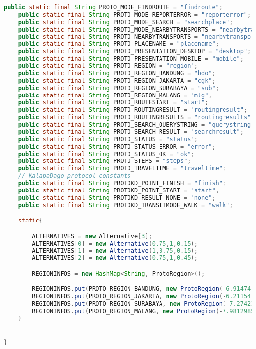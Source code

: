 \begin{lstlisting}[language=Java,basicstyle=\tiny,caption=Constants.java]
    public static final String PROTO_MODE_FINDROUTE = "findroute";
    public static final String PROTO_MODE_REPORTERROR = "reporterror";
    public static final String PROTO_MODE_SEARCH = "searchplace";
    public static final String PROTO_MODE_NEARBYTRANSPORTS = "nearbytransports";
    public static final String PROTO_NEARBYTRANSPORTS = "nearbytransports";
    public static final String PROTO_PLACENAME = "placename";
    public static final String PROTO_PRESENTATION_DESKTOP = "desktop";
    public static final String PROTO_PRESENTATION_MOBILE = "mobile";
    public static final String PROTO_REGION = "region";
    public static final String PROTO_REGION_BANDUNG = "bdo";
    public static final String PROTO_REGION_JAKARTA = "cgk";
    public static final String PROTO_REGION_SURABAYA = "sub";
    public static final String PROTO_REGION_MALANG = "mlg";
    public static final String PROTO_ROUTESTART = "start";
    public static final String PROTO_ROUTINGRESULT = "routingresult";
    public static final String PROTO_ROUTINGRESULTS = "routingresults";
    public static final String PROTO_SEARCH_QUERYSTRING = "querystring";
    public static final String PROTO_SEARCH_RESULT = "searchresult";
    public static final String PROTO_STATUS = "status";
    public static final String PROTO_STATUS_ERROR = "error";
    public static final String PROTO_STATUS_OK = "ok";
    public static final String PROTO_STEPS = "steps";
    public static final String PROTO_TRAVELTIME = "traveltime";
    // KalapaDago protocol constants
    public static final String PROTOKD_POINT_FINISH = "finish";
    public static final String PROTOKD_POINT_START = "start";
    public static final String PROTOKD_RESULT_NONE = "none";
    public static final String PROTOKD_TRANSITMODE_WALK = "walk";

    static{

        ALTERNATIVES = new Alternative[3];
        ALTERNATIVES[0] = new Alternative(0.75,1,0.15);
        ALTERNATIVES[1] = new Alternative(1,0.75,0.15);
        ALTERNATIVES[2] = new Alternative(0.75,1,0.45);

        REGIONINFOS = new HashMap<String, ProtoRegion>();

        REGIONINFOS.put(PROTO_REGION_BANDUNG, new ProtoRegion(-6.91474, 107.60981, 17000, 12, ", *(bandung|bdg)$", "Bandung"));
        REGIONINFOS.put(PROTO_REGION_JAKARTA, new ProtoRegion(-6.21154, 106.84517, 15000, 11, ", *(jakarta|jkt)$", "Jakarta"));
        REGIONINFOS.put(PROTO_REGION_SURABAYA, new ProtoRegion(-7.27421, 112.71908, 15000, 12, ", *(surabaya|sby)$", "Surabaya"));
        REGIONINFOS.put(PROTO_REGION_MALANG, new ProtoRegion(-7.9812985, 112.6319264, 15000, 13, ", *(malang|mlg)$", "Malang"));
    }


}


\end{lstlisting}




